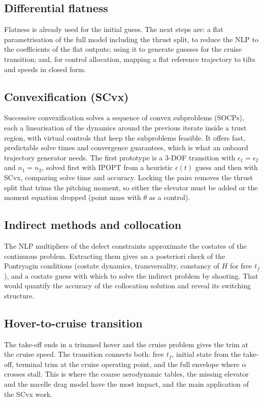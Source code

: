 \documentclass[11pt,a4paper]{article}
\begin{document}
\subsection{Differential flatness}
Flatness is already used for the initial guess. The next steps are: a flat parametrisation of the full
model including the thrust split, to reduce the NLP to the coefficients of the flat outputs; using it to
generate guesses for the cruise transition; and, for control allocation, mapping a flat reference
trajectory to tilts and speeds in closed form.

\subsection{Convexification (SCvx)}
Successive convexification solves a sequence of convex subproblems (SOCPs), each a linearisation of the
dynamics around the previous iterate inside a trust region, with virtual controls that keep the
subproblems feasible. It offers fast, predictable solve times and convergence guarantees, which is
what an onboard trajectory generator needs. The first prototype is a 3-DOF transition with
$\epsilon_1 = \epsilon_2$ and $n_1 = n_2$, solved first with IPOPT from a heuristic $\epsilon(t)$ guess and
then with SCvx, comparing solve time and accuracy. Locking the pairs removes the thrust split that
trims the pitching moment, so either the elevator must be added or the moment equation dropped
(point mass with $\theta$ as a control).

\subsection{Indirect methods and collocation}
The NLP multipliers of the defect constraints approximate the costates of the continuous problem.
Extracting them gives an a posteriori check of the Pontryagin conditions (costate dynamics,
transversality, constancy of $H$ for free $t_f$), and a costate guess with which to solve the
indirect problem by shooting. That would quantify the accuracy of the collocation solution and
reveal its switching structure.

\subsection{Hover-to-cruise transition}
The take-off ends in a trimmed hover and the cruise problem gives the trim at the cruise speed.
The transition connects both: free $t_f$, initial state from the take-off, terminal trim at the cruise
operating point, and the full envelope where $\alpha$ crosses stall. This is where the coarse aerodynamic
tables, the missing elevator and the nacelle drag model have the most impact, and the main
application of the SCvx work.
\end{document}
